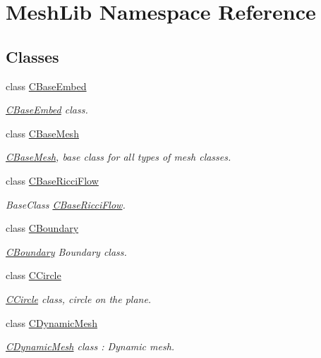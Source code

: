 \hypertarget{namespace_mesh_lib}{}\section{Mesh\+Lib Namespace Reference}
\label{namespace_mesh_lib}
\subsection*{Classes}
\begin{DoxyCompactItemize}
\item 
class \hyperlink{class_mesh_lib_1_1_c_base_embed}{C\+Base\+Embed}
\begin{DoxyCompactList}\small\item\em \hyperlink{class_mesh_lib_1_1_c_base_embed}{C\+Base\+Embed} class. \end{DoxyCompactList}\item 
class \hyperlink{class_mesh_lib_1_1_c_base_mesh}{C\+Base\+Mesh}
\begin{DoxyCompactList}\small\item\em \hyperlink{class_mesh_lib_1_1_c_base_mesh}{C\+Base\+Mesh}, base class for all types of mesh classes. \end{DoxyCompactList}\item 
class \hyperlink{class_mesh_lib_1_1_c_base_ricci_flow}{C\+Base\+Ricci\+Flow}
\begin{DoxyCompactList}\small\item\em Base\+Class \hyperlink{class_mesh_lib_1_1_c_base_ricci_flow}{C\+Base\+Ricci\+Flow}. \end{DoxyCompactList}\item 
class \hyperlink{class_mesh_lib_1_1_c_boundary}{C\+Boundary}
\begin{DoxyCompactList}\small\item\em \hyperlink{class_mesh_lib_1_1_c_boundary}{C\+Boundary} Boundary class. \end{DoxyCompactList}\item 
class \hyperlink{class_mesh_lib_1_1_c_circle}{C\+Circle}
\begin{DoxyCompactList}\small\item\em \hyperlink{class_mesh_lib_1_1_c_circle}{C\+Circle} class, circle on the plane. \end{DoxyCompactList}\item 
class \hyperlink{class_mesh_lib_1_1_c_dynamic_mesh}{C\+Dynamic\+Mesh}
\begin{DoxyCompactList}\small\item\em \hyperlink{class_mesh_lib_1_1_c_dynamic_mesh}{C\+Dynamic\+Mesh} class \+: Dynamic mesh. \end{DoxyCompactList}\item 

\end{DoxyCompactItemize}
